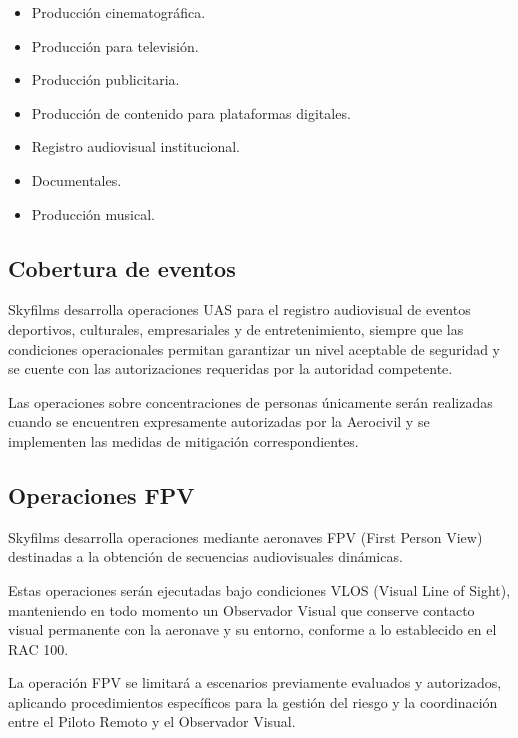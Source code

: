 \begin{itemize}

\item Producción cinematográfica.

\item Producción para televisión.

\item Producción publicitaria.

\item Producción de contenido para plataformas digitales.

\item Registro audiovisual institucional.

\item Documentales.

\item Producción musical.

\end{itemize}


\subsection{Cobertura de eventos}

Skyfilms desarrolla operaciones UAS para el registro audiovisual de eventos deportivos, culturales, empresariales y de entretenimiento, siempre que las condiciones operacionales permitan garantizar un nivel aceptable de seguridad y se cuente con las autorizaciones requeridas por la autoridad competente.

Las operaciones sobre concentraciones de personas únicamente serán realizadas cuando se encuentren expresamente autorizadas por la Aerocivil y se implementen las medidas de mitigación correspondientes.

\subsection{Operaciones FPV}

Skyfilms desarrolla operaciones mediante aeronaves FPV (First Person View) destinadas a la obtención de secuencias audiovisuales dinámicas.

Estas operaciones serán ejecutadas bajo condiciones VLOS (Visual Line of Sight), manteniendo en todo momento un Observador Visual que conserve contacto visual permanente con la aeronave y su entorno, conforme a lo establecido en el RAC 100.

La operación FPV se limitará a escenarios previamente evaluados y autorizados, aplicando procedimientos específicos para la gestión del riesgo y la coordinación entre el Piloto Remoto y el Observador Visual.



